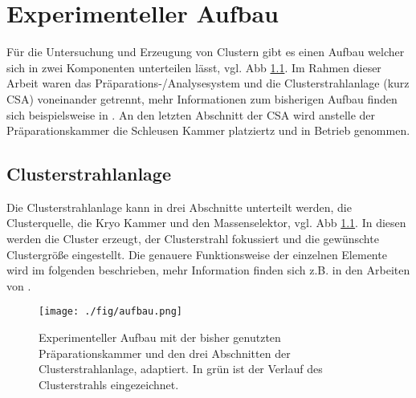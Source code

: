 \chapter{Experimenteller Aufbau}
Für die Untersuchung und Erzeugung von Clustern gibt es einen Aufbau welcher sich in zwei Komponenten unterteilen lässt, vgl. Abb \ref{fig:csaaufbau}.
Im Rahmen dieser Arbeit waren das Präparations-/Analysesystem und die Clusterstrahlanlage (kurz CSA) voneinander getrennt, mehr Informationen zum bisherigen Aufbau finden sich beispielsweise in \cite{wolter}.
An den letzten Abschnitt der CSA wird anstelle der Präparationskammer die Schleusen Kammer platziertz und in Betrieb genommen.

\section{Clusterstrahlanlage}
Die Clusterstrahlanlage kann in drei Abschnitte unterteilt werden, die Clusterquelle, die Kryo Kammer und den Massenselektor, vgl. Abb \ref{fig:csaaufbau}.
In diesen werden die Cluster erzeugt, der Clusterstrahl fokussiert und die gewünschte Clustergröße eingestellt.
Die genauere Funktionsweise der einzelnen Elemente wird im folgenden beschrieben, mehr Information finden sich z.B. in den Arbeiten von \cite{duffe, schröder, wolter}.
\begin{figure}
    \centering
    \texttt{[image: ./fig/aufbau.png]}
    \caption{Experimenteller Aufbau mit der bisher genutzten Präparationskammer und den drei Abschnitten der Clusterstrahlanlage, \cite[S. 20]{wolter} adaptiert. 
    In grün ist der Verlauf des Clusterstrahls eingezeichnet.}
    \label{fig:csaaufbau}
\end{figure}
